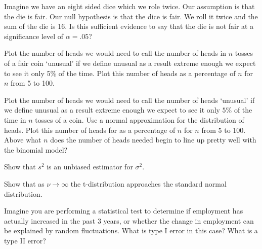 \begin{exe} Imagine we have an eight sided dice which we role twice. Our assumption is that the die is fair.  Our null hypothesis is that the dice is fair.  We roll it twice and the sum of the die is 16. Is this sufficient evidence to say that the die is not fair at a significance level of $\alpha=.05$? \end{exe}


\begin{exe} Plot the number of heads we would need to call the number of heads in $n$ tosses of a fair coin `unusual' if we define unusual as a result extreme enough we expect to see it only 5\% of the time.  Plot this number of heads as a percentage of $n$ for $n$ from 5 to 100. \end{exe}

\begin{exe} Plot the number of heads we would need to call the number of heads `unusual' if we define unusual as a result extreme enough we expect to see it only $5\%$ of the time in $n$ tosses of a coin. Use a normal approximation for the distribution of heads.  Plot this number of heads for as a percentage of $n$ for $n$ from 5 to 100.  Above what $n$ does the number of heads needed begin to line up pretty well with the binomial model? \end{exe}

\begin{exe} Show that $s^2$ is an unbiased estimator for $\sigma^2$. \end{exe}

\begin{exe} Show that as $\nu \to \infty$ the t-distribution approaches the standard normal distribution. \end{exe}

\begin{exe} Imagine you are performing a statistical test to determine if employment has actually increased in the past 3 years, or whether the change in employment can be explained by random fluctuations.  What is type I error in this case? What is a type II error? \end{exe}

